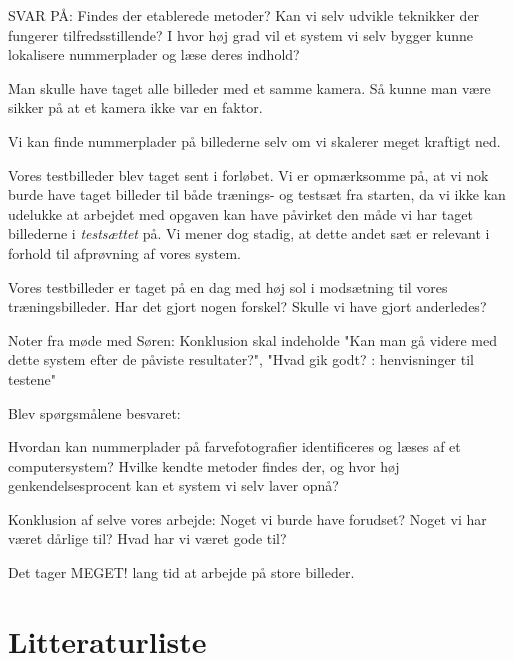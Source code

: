 \documentclass[11pt,a4paper,final]{article}
\begin{document}
SVAR PÅ:
Findes der etablerede metoder?
Kan vi selv udvikle teknikker der fungerer tilfredsstillende?
I hvor høj grad vil et system vi selv bygger kunne lokalisere nummerplader og læse deres indhold?








Man skulle have taget alle billeder med et samme kamera. Så kunne man være sikker på at et kamera ikke var en faktor.


Vi kan finde nummerplader på billederne selv om vi skalerer meget kraftigt ned.


Vores testbilleder blev taget sent i forløbet. Vi er opmærksomme på, at vi nok burde have taget  billeder til både trænings- og testsæt fra starten, da vi ikke kan udelukke at arbejdet med opgaven kan have påvirket den måde vi har taget billederne i \textit{testsættet} på. Vi mener dog stadig, at dette andet sæt er relevant i forhold til afprøvning af vores system.

Vores testbilleder er taget på en dag med høj sol i modsætning til vores træningsbilleder. Har det gjort nogen forskel? Skulle vi have gjort anderledes?


Noter fra møde med Søren: Konklusion skal indeholde "Kan man gå videre med dette system efter de påviste resultater?", "Hvad gik godt? : henvisninger til testene"



Blev spørgsmålene besvaret:

Hvordan kan nummerplader på farvefotografier identificeres og læses af et computersystem? Hvilke kendte metoder findes der, og hvor høj genkendelsesprocent kan et system vi selv laver opnå?


Konklusion af selve vores arbejde: Noget vi burde have forudset? Noget vi har været dårlige til? Hvad har vi været gode til?


Det tager MEGET! lang tid at arbejde på store billeder.






\newpage %
\section{Litteraturliste}
\end{document}
